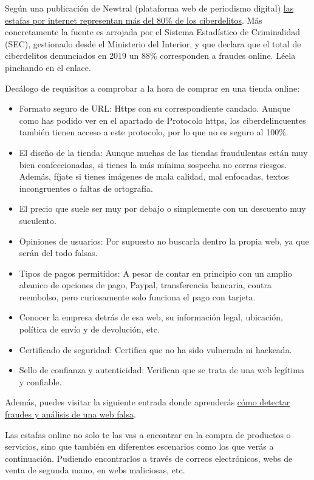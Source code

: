 \documentclass[
  a4paper,
  openany]{book}
\begin{document}
Según una publicación de Newtral (plataforma web de periodismo digital) \href{https://www.newtral.es/estafas-internet-ciberdelitos/20210806/}{las estafas por internet representan más del 80\% de los ciberdelitos}. Más concretamente la fuente es arrojada por el Sistema Estadístico de Criminalidad (SEC), gestionado desde el Ministerio del Interior, y que declara que el total de ciberdelitos denunciados en 2019 un 88\% corresponden a fraudes online. Léela pinchando en el enlace.

Decálogo de requisitos a comprobar a la hora de comprar en una tienda online:

\begin{itemize}
\item
  Formato seguro de URL: Https con su correspondiente candado. Aunque como has podido ver en el apartado de Protocolo https, los ciberdelincuentes también tienen acceso a este protocolo, por lo que no es seguro al 100\%.
\item
  El diseño de la tienda: Aunque muchas de las tiendas fraudulentas están muy bien confeccionadas, si tienes la más mínima sospecha no corras riesgos. Además, fíjate si tienes imágenes de mala calidad, mal enfocadas, textos incongruentes o faltas de ortografía.
\item
  El precio que suele ser muy por debajo o simplemente con un descuento muy suculento.
\item
  Opiniones de usuarios: Por supuesto no buscarla dentro la propia web, ya que serán del todo falsas.
\item
  Tipos de pagos permitidos: A pesar de contar en principio con un amplio abanico de opciones de pago, Paypal, transferencia bancaria, contra reembolso, pero curiosamente solo funciona el pago con tarjeta.
\item
  Conocer la empresa detrás de esa web, su información legal, ubicación, política de envío y de devolución, etc.
\item
  Certificado de seguridad: Certifica que no ha sido vulnerada ni hackeada.
\item
  Sello de confianza y autenticidad: Verifican que se trata de una web legítima y confiable.
\end{itemize}

Además, puedes visitar la siguiente entrada donde aprenderás \href{https://www.osi.es/es/actualidad/blog/2018/08/08/detectando-fraudes-analisis-de-una-web-de-venta-falsa}{cómo detectar fraudes y análisis de una web falsa}.

Las estafas online no solo te las vas a encontrar en la compra de productos o servicios, sino que también en diferentes escenarios como los que verás a continuación. Pudiendo encontrarlos a través de correos electrónicos, webs de venta de segunda mano, en webs maliciosas, etc.
\end{document}
